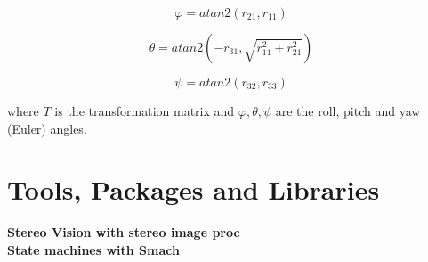 \[
φ = atan2(r_{21}, r_{11})
\]

\[
θ = atan2(-r_{31}, \sqrt{r_{11}^2 + r_{21}^2})
\]

\[
ψ = atan2(r_{32}, r_{33})
\]

where $T$ is the transformation matrix and $φ, θ, ψ$ are the roll, pitch and yaw (Euler) angles.


\section{Tools, Packages and Libraries}

\textbf{Stereo Vision with stereo image proc} \\

\textbf{State machines with Smach} \\